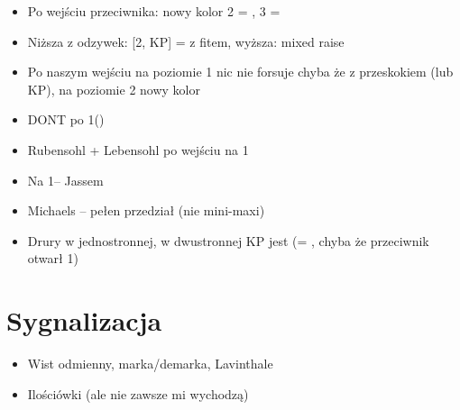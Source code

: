 \documentclass[12pt, a4paper]{report}
\begin{document}
{        \begin{itemize}
            \item Po wejściu przeciwnika: nowy kolor 2 = \nf, 3 = \gf
            \item Niższa z odzywek: [2\nt, KP] = \invp z fitem, wyższa: mixed raise
            \item Po naszym wejściu na poziomie 1 nic nie forsuje chyba że z przeskokiem (lub KP), 
            na poziomie 2 nowy kolor \fonce
            \item DONT po 1\nt (\dbl)
            \item Rubensohl + Lebensohl po wejściu na 1\nt
            \item Na 1\nt -- Jassem
            \item Michaels -- pełen przedział (nie mini-maxi)
            \item Drury w jednostronnej, w dwustronnej KP jest \invp (\clubs = \nat, chyba że przeciwnik otwarł 1\clubs)
        \end{itemize}

    \section*{\colorbox{blue!30}{Sygnalizacja}}

        \begin{itemize}
            \item Wist odmienny, marka/demarka, Lavinthale
            \item Ilościówki (ale nie zawsze mi wychodzą)
        \end{itemize}
}

\newpage
\end{document}
